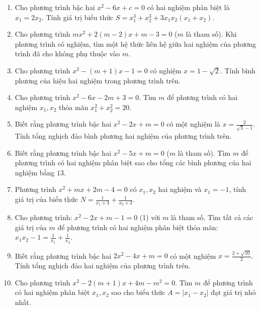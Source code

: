\documentclass[12pt,a4paper]{extarticle}
\begin{document}
\begin{enumerate}
    \item[\textbf{Câu 11:}] Cho phương trình bậc hai $x^2 - 6x + c = 0$ có hai nghiệm phân biệt là $x_1 = 2x_2$. Tính giá trị biểu thức $S = x_1^3 + x_2^3 + 3x_1x_2(x_1 + x_2)$.
    
    \item[\textbf{Câu 12:}] Cho phương trình $mx^2 + 2(m-2)x + m - 3 = 0$ ($m$ là tham số). Khi phương trình có nghiệm, tìm một hệ thức liên hệ giữa hai nghiệm của phương trình đã cho không phụ thuộc vào $m$.
    
    \item[\textbf{Câu 13:}] Cho phương trình $x^2 - (m+1)x - 1 = 0$ có nghiệm $x = 1 - \sqrt{2}$. Tính bình phương của hiệu hai nghiệm trong phương trình trên.
    
    \item[\textbf{Câu 14:}] Cho phương trình $x^2 - 6x - 2m + 3 = 0$. Tìm $m$ để phương trình có hai nghiệm $x_1, x_2$ thỏa mãn $x_1^2 + x_2^2 = 20$.
    
    \item[\textbf{Câu 15:}] Biết rằng phương trình bậc hai $x^2 - 2x + m = 0$ có một nghiệm là $x = \frac{2}{\sqrt{3}-1}$. Tính tổng nghịch đảo bình phương hai nghiệm của phương trình trên.
    
    \item[\textbf{Câu 16:}] Biết rằng phương trình bậc hai $x^2 - 5x + m = 0$ ($m$ là tham số). Tìm $m$ để phương trình có hai nghiệm phân biệt sao cho tổng các bình phương của hai nghiệm bằng $13$.
    
    \item[\textbf{Câu 17:}] Phương trình $x^2 + mx + 2m - 4 = 0$ có $x_1, x_2$ hai nghiệm và $x_1 = -1$, tính giá trị của biểu thức $N = \frac{1}{x_1 + 3} + \frac{1}{x_2 + 3}$.
    
    \item[\textbf{Câu 18:}] Cho phương trình: $x^2 - 2x + m - 1 = 0$ (1) với $m$ là tham số. Tìm tất cả các giá trị của $m$ để phương trình có hai nghiệm phân biệt thỏa mãn: $x_1x_2 - 1 = \frac{1}{x_1} + \frac{1}{x_2}$.
    
    \item[\textbf{Câu 19:}] Biết rằng phương trình bậc hai $2x^2 - 4x + m = 0$ có một nghiệm $x = \frac{2 + \sqrt{10}}{2}$. Tính tổng nghịch đảo hai nghiệm của phương trình trên.
    
    \item[\textbf{Câu 20:}] Cho phương trình $x^2 - 2(m+1)x + 4m - m^2 = 0$. Tìm $m$ để phương trình có hai nghiệm phân biệt $x_1, x_2$ sao cho biểu thức $A = |x_1 - x_2|$ đạt giá trị nhỏ nhất.
\end{enumerate}
\end{document}
